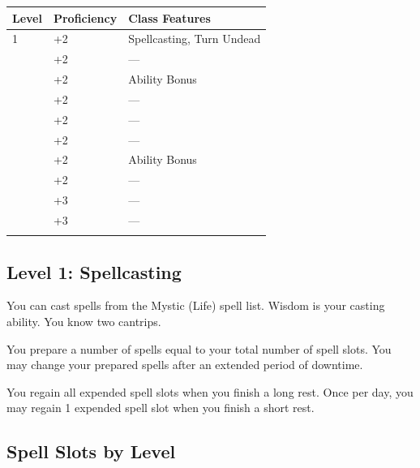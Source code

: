 \documentclass[12pt,letterpaper,twocolumn,openany,nodeprecatedcode,bg=none]{dndbook}
\let\oldsubsection\subsection
\renewcommand{\subsection}[1]{%
  \needspace{5\baselineskip}%
  \oldsubsection{#1}%
}
\begin{document}

{\def\LTcaptype{none} %
\begin{table}[!htbp]
\centering
\begin{tabular}{@{}
  >{\raggedright\arraybackslash}p{}
  >{\raggedright\arraybackslash}p{}
  >{\raggedright\arraybackslash}p{}@{}}
\toprule\noalign{}
\begin{minipage}[b]{\linewidth}\raggedright
Level
\end{minipage} & \begin{minipage}[b]{\linewidth}\raggedright
Proficiency
\end{minipage} & \begin{minipage}[b]{\linewidth}\raggedright
Class Features
\end{minipage} \\
\midrule\noalign{}
1 & +2 & Spellcasting, Turn Undead \\
2 & +2 & --- \\
3 & +2 & Ability Bonus \\
4 & +2 & --- \\
5 & +2 & --- \\
6 & +2 & --- \\
7 & +2 & Ability Bonus \\
8 & +2 & --- \\
9 & +3 & --- \\
10 & +3 & --- \\
\bottomrule\noalign{}
\end{tabular}
\end{table}
}

\subsection{Level 1: Spellcasting}\label{level-1-spellcasting}

You can cast spells from the Mystic (Life) spell list. Wisdom is your
casting ability. You know two cantrips.

You prepare a number of spells equal to your total number of spell
slots. You may change your prepared spells after an extended period of
downtime.

You regain all expended spell slots when you finish a long rest. Once
per day, you may regain 1 expended spell slot when you finish a short
rest.

\subsection{Spell Slots by Level}\label{spell-slots-by-level}
\end{document}
